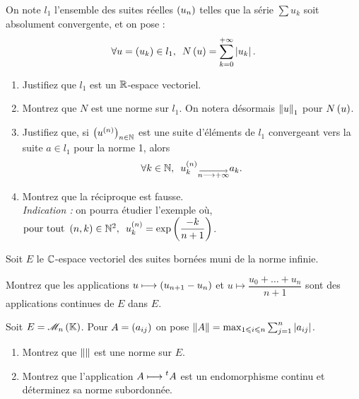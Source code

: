 \begin{corr}
\end{corr}

\begin{exopss}[Exercice 8]
On note \(l_1\) l'ensemble des suites réelles \(\left(u_n\right)\) telles que la série \(\sum u_k\) soit absolument convergente, et on pose : \[\quantifs{\forall u=\paren{u_k}\in l_1}N\paren{u}=\sum_{k=0}^{\pinf}\abs{u_k}.\]

\begin{enumerate}
    \item Justifiez que \(l_1\) est un \(\mathbb{R}\)-espace vectoriel. \\
    \item Montrez que \(N\) est une norme sur \(l_1\). On notera désormais \(\left\|u\right\|_1\) pour \(N\left(u\right)\). \\
    \item Justifiez que, si \(\left(u^{\left(n\right)}\right)_{n\in\mathbb{N}}\) est une suite d'éléments de \(l_1\) convergeant vers la suite \(a\in l_1\) pour la norme 1, alors \[\quantifs{\forall k\in\N}u_k\deriv{n}\tendqd{n\to\pinf}a_k.\]
    \item Montrez que la réciproque est fausse. \\ \textit{Indication :} on pourra étudier l'exemple où, \(\quantifs{\tpt\paren{n,k}\in\N^2}u_k\deriv{n}=\exp\paren{\dfrac{-k}{n+1}}\).
\end{enumerate}
\end{exopss}

\begin{corr}
\end{corr}

\begin{exops}[Exercice 9]
Soit \(E\) le \(\mathbb{C}\)-espace vectoriel des suites bornées muni de la norme infinie.

Montrez que les applications \(u\longmapsto\left(u_{n+1}-u_n\right)\) et \(u\mapsto\dfrac{u_0+\dots+u_n}{n+1}\) sont des applications continues de \(E\) dans \(E\).
\end{exops}

\begin{corr}
\end{corr}

\begin{exopss}[Exercice 10]
Soit \(E=\M{n}\). Pour \(A=\left(a_{ij}\right)\) on pose \(\left\|A\right\|=\max_{1\leqslant i\leqslant n}\sum_{j=1}^n\left\lvert a_{ij}\right\rvert\).

\begin{enumerate}
    \item Montrez que \(\left\|\right\|\) est une norme sur \(E\). \\
    \item Montrez que l'application \(A\longmapsto\prescript{t}{}{A}\) est un endomorphisme continu et déterminez sa norme subordonnée.
\end{enumerate}
\end{exopss}

